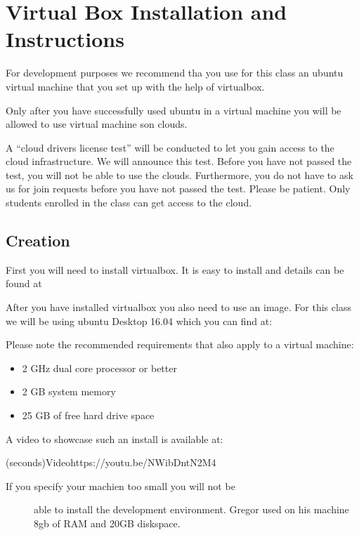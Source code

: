 \FILENAME

\section{Virtual Box Installation and Instructions}\label{virtual-box-installation-and-instructions}

For development purposes we recommend tha you use for this class an
ubuntu virtual machine that you set up with the help of virtualbox.

Only after you have successfully used ubuntu in a virtual machine you
will be allowed to use virtual machine son clouds.

A ``cloud drivers license test'' will be conducted to let you gain
access to the cloud infrastructure. We will announce this test. Before
you have not passed the test, you will not be able to use the clouds.
Furthermore, you do not have to ask us for join requests before you have
not passed the test. Please be patient. Only students enrolled in the
class can get access to the cloud.

\subsection{Creation}\label{creation}

First you will need to install virtualbox. It is easy to install and
details can be found at



After you have installed virtualbox you also need to use an image. For
this class we will be using ubuntu Desktop 16.04 which you can find at:



Please note the recommended requirements that also apply to a virtual
machine:

\begin{itemize}
\tightlist
\item
  2 GHz dual core processor or better
\item
  2 GB system memory
\item
  25 GB of free hard drive space
\end{itemize}

A video to showcase such an install is available at:

(seconds){Video}{https://youtu.be/NWibDntN2M4}

\begin{description}
\item[If you specify your machien too small you will not be]
able to install the development environment. Gregor used on his machine
8gb of RAM and 20GB diskspace.
\end{description}

